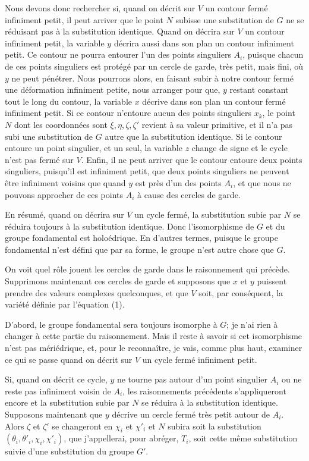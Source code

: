 \documentclass{article}
\begin{document}
Nous devons donc rechercher si, quand on décrit sur $V$ un contour fermé infiniment petit, il peut arriver que le point $N$ subisse une substitution de $G$ ne se réduisant pas à la substitution identique. Quand on décrira sur $V$ un contour infiniment petit, la variable $y$ décrira aussi dans son plan un contour infiniment petit. Ce contour ne pourra entourer l'un des points singuliers $A_{i}$, puisque chacun de ces points singuliers est protégé par un cercle de garde, très petit, mais fini, où $y$ ne peut pénétrer. Nous pourrons alors, en faisant subir à notre contour fermé une déformation infiniment petite, nous arranger pour que, $y$ restant constant tout le long du contour, la variable $x$ décrive dans son plan un contour fermé infiniment petit. Si ce contour n'entoure aucun des points singuliers $x_{k}$, le point $N$ dont les coordonnées sont $\xi, \eta, \zeta, \zeta'$ revient à sa valeur primitive, et il n'a pas subi une substitution de $G$ autre que la substitution identique. Si le contour entoure un point singulier, et un seul, la variable $z$ change de signe et le cycle n'est pas fermé sur $V$. Enfin, il ne peut arriver que le contour entoure deux points singuliers, puisqu'il est infiniment petit, que deux points singuliers ne peuvent être infiniment voisins
que quand $y$ est près d'un des points $A_{i}$, et que nous ne pouvons approcher de ces points $A_{i}$ à cause des cercles de garde.

En résumé, quand on décrira sur $V$ un cycle fermé, la substitution subie par $N$ se réduira toujours à la substitution identique. Donc l'isomorphisme de $G$ et du groupe fondamental est holoédrique. En d'autres termes, puisque le groupe fondamental n'est défini que par sa forme, le groupe n'est autre chose que $G$.

On voit quel rôle jouent les cercles de garde dans le raisonnement qui précède. Supprimons maintenant ces cercles de garde et supposons que $x$ et $y$ puissent prendre des valeurs complexes quelconques, et que $V$ soit, par conséquent, la variété définie par l'équation (1).

D'abord, le groupe fondamental sera toujours isomorphe à $G$; je n'ai rien à changer à cette partie du raisonnement. Mais il reste à savoir si cet isomorphisme n'est pas mériédrique, et, pour le reconnaître, je vais, comme plus haut, examiner ce qui se passe quand on décrit sur $V$ un cycle fermé infiniment petit.

Si, quand on décrit ce cycle, $y$ ne tourne pas autour d'un point singulier $A_{i}$ ou ne reste pas infiniment voisin de $A_{i}$, les raisonnements précédents s'appliqueront encore et la substitution subie par $N$ se réduira à la substitution identique. Supposons maintenant que $y$ décrive un cercle fermé très petit autour de $A_{i}$. Alors $\zeta$ et $\zeta'$ se changeront en $\chi_{i}$ et $\chi'_{i}$ et $N$ subira soit la substitution $(\theta_{i}, \theta'_{i}, \chi_{i}, \chi'_{i})$, que j'appellerai, pour abréger, $T_{i}$, soit cette même substitution suivie d'une substitution du groupe $G'$.
\end{document}
